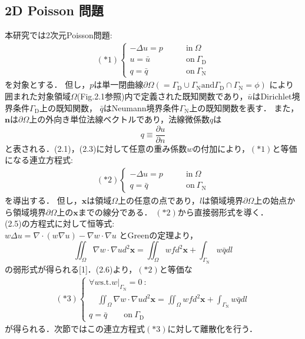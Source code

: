 \documentclass[twocolumn,head_space=15.0mm,foot_space=15.0mm,fleqn]{jlreq}
\numberwithin{equation}{section}
\begin{document}
\subsection{2D Poisson 問題}
本研究では2次元Poisson問題:
\begin{align}
	\left( *1 \right)
	\begin{cases}
		-\Delta u = p &\qquad \text{in} \ \Omega \\
		u = \bar{u} &\qquad \text{on} \ \Gamma_{\mathrm{D}} \\
		q = \bar{q} &\qquad \text{on} \ \Gamma_{\mathrm{N}}
	\end{cases}
\end{align}
を対象とする．
但し，$p$は単一閉曲線$\partial \Omega \left( =\Gamma_{\mathrm{D}} \cup \Gamma_{\mathrm{N}} \text{and} \Gamma_{\mathrm{D}} \cap \Gamma_{\mathrm{N}} = \phi \right)$
により囲まれた対象領域$\Omega$(Fig.2.1参照)内で定義された既知関数であり，$\bar{u}$はDirichlet境界条件$\Gamma_{\mathrm{D}}$上の既知関数，
$\bar{q}$はNeumann境界条件$\Gamma_{\mathrm{N}}$上の既知関数を表す．
また，$\boldsymbol{n}$は$\partial \Omega$上の外向き単位法線ベクトルであり，法線微係数$q$は
\begin{equation}
	q \equiv \frac{ \partial u }{\partial n }
\end{equation}
と表される．(2.1)，(2.3)に対して任意の重み係数$w$の付加により，$\left(*1\right)$と等価になる連立方程式:
\begin{align}
	\left( *2 \right)
	\begin{cases}
		-\Delta u = p &\qquad \text{in} \ \Omega \\
		q = \bar{q} &\qquad \text{on} \ \Gamma_{\mathrm{N}}
	\end{cases}
\end{align}
を導出する．
但し，$\boldsymbol{x}$は領域$\Omega$上の任意の点であり，$l$は領域境界$\partial \Omega$上の始点から領域境界$\partial \Omega$上の$\boldsymbol{x}$までの線分である．
$\left( *2 \right)$から直接弱形式を導く． \\
(2.5)の方程式に対して恒等式: \\
$w \Delta u = \nabla \cdot \left( w \nabla u \right) - \nabla w \cdot \nabla u$ とGreenの定理より，
\begin{equation}
	\iint_{\Omega} \nabla w \cdot \nabla u d^2 \boldsymbol{x} = \iint_{\Omega} wf d^2 \boldsymbol{x} + \int_{\Gamma_{\mathrm{N}}} w \bar{q} d l
\end{equation}
の弱形式が得られる[1]．(2.6)より，$ \left( *2 \right) $と等価な \newpage
\begin{align*}
	\left( *3 \right)
	\begin{cases}
		\forall w \text{s.t.} w|_{\Gamma_{\mathrm{N}}}=0 \ : \\
		  \quad \iint_{\Omega} \nabla w \cdot \nabla u d^2 \boldsymbol{x} = \iint_{\Omega} wf d^2 \boldsymbol{x} + \int_{\Gamma_{\mathrm{N}}} w \bar{q} d l \\
		q = \bar{q} \qquad \text{on} \ \Gamma_{\mathrm{D}}
	\end{cases}
\end{align*}
が得られる．次節ではこの連立方程式$\left( *3 \right)$に対して離散化を行う．
\end{document}
